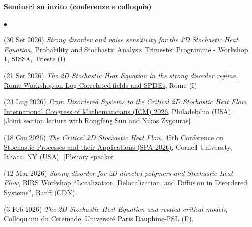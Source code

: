 \documentclass[a4paper,11pt,oneside]{amsart}
\newenvironment{myitemize}{%
\begin{list}{$\bullet$}%
 	{%
	\setlength{\itemsep}{0.3em}%
	\setlength{\topsep}{0.3em}%
	\setlength{\partopsep}{0em}%
	\setlength{\parsep}{0em}%
	\setlength{\parskip}{0em}%
	\setlength\leftmargin{1.5em}%
	\setlength\labelwidth{1.1em}%
	\setlength{\labelsep}{0.4em}%
	}%
	}%
{\end{list}}
\renewenvironment{itemize}{
\begin{myitemize}}%
{\end{myitemize}}
\begin{document}



\medskip
{\large\sf \bfseries Seminari su invito (conferenze e colloquia)}
\smallskip

\begin{itemize}
\item (30 Set 2026)
\emph{Strong disorder and noise sensitivity for the 2D Stochastic Heat Equation},
\href{https://sites.google.com/view/probsissa/workshop-1}{Probability and Stochastic Analysis Trimester Programme - Workshop 1}, SISSA, Trieste (I)

\item (21 Set 2026)
\emph{The 2D Stochastic Heat Equation in the strong disorder regime},
\href{https://sites.google.com/view/log-spde-rome/home-page}{Rome Workshop on Log-Correlated fields and SPDEs}, Rome (I)

\item (24 Lug 2026)
\emph{From Disordered Systems to the Critical 2D Stochastic Heat Flow},
\href{https://www.icm2026.org/event/ac193975-5d24-4628-8c30-ddb23de19a8b/HOME?environment=P2}{International Congress of Mathematicians (ICM) 2026},
Philadelphia (USA). {[Joint section lecture with Rongfeng Sun and Nikos Zygouras]}

\item (18 Giu 2026)
\emph{The Critical 2D Stochastic Heat Flow},
\href{https://events.ces.scl.cornell.edu/event/spa2026/summary}{45th Conference on Stochastic Processes and their Applications (SPA 2026)},
Cornell University, Ithaca, NY (USA). [Plenary speaker]

\item (12 Mar 2026)
\emph{Strong disorder for 2D directed polymers and Stochastic Heat Flow},
BIRS Workshop \href{https://www.birs.ca/events/2025/5-day-workshops/26w5634}{``Localization, Delocalization, and Diffusion in Disordered Systems''},
Banff (CDN).

\item (3 Feb 2026)
\emph{The 2D Stochastic Heat Equation and related critical models},
\href{https://www.ceremade.dauphine.fr/fr/actualites/detail-de-lactualite/article/colloquium-du-ceremade-francesco-caravenna-mardi-3-fevrier-2026.html}{Colloquium du Ceremade},
Université Paris Dauphine-PSL (F).


\end{itemize}
\end{document}
